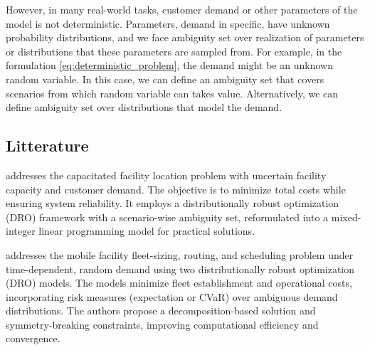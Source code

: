 \documentclass[12pt, letterpaper]{article}
\begin{document}
	However, in many real-world tasks, customer demand or other parameters of the model is not deterministic. Parameters, demand in specific, have unknown probability distributions, and we face ambiguity set over realization of parameters or distributions that these parameters are sampled from. For example, in the formulation \eqref{eq:deterministic_problem}, the demand might be an unknown random variable. In this case, we can define an ambiguity set that covers scenarios from which random variable can takes value. Alternatively, we can define ambiguity set over distributions that model the demand.
	
	\subsection*{Litterature}
	\cite{cheng_distributionally_2024} addresses the capacitated facility location problem with uncertain facility capacity and customer demand. The objective is to minimize total costs while ensuring system reliability. It employs a distributionally robust optimization (DRO) framework with a scenario-wise ambiguity set, reformulated into a mixed-integer linear programming model for practical solutions.

	\cite{shehadeh_distributionally_2023} addresses the mobile facility fleet-sizing, routing, and scheduling problem under time-dependent, random demand using two distributionally robust optimization (DRO) models. The models minimize fleet establishment and operational costs, incorporating risk measures (expectation or CVaR) over ambiguous demand distributions. The authors propose a decomposition-based solution and symmetry-breaking constraints, improving computational efficiency and convergence.
\end{document}
